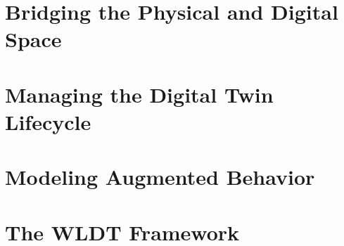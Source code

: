 \section{Bridging the Physical and Digital Space}

\section{Managing the Digital Twin Lifecycle}

\section{Modeling Augmented Behavior}

\section{The \acl{WLDT} Framework}

